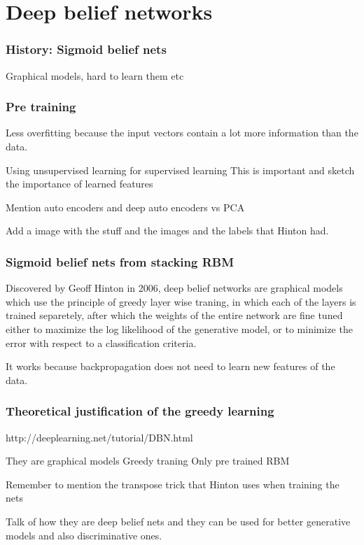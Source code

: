 \documentclass[11pt, fleqn, twoside]{article}
\begin{document}
\section{ Deep belief networks}

\subsubsection{ History: Sigmoid belief nets}
  Graphical models, hard to learn them etc

\subsubsection{Pre training}
  Less overfitting because the input vectors contain a lot more information than the data.

  Using unsupervised learning for supervised learning
  This is important and sketch the importance of learned features

  Mention auto encoders and deep auto encoders vs PCA

  Add a image with the stuff and the images and the labels that Hinton had.


\subsubsection{ Sigmoid belief nets from stacking RBM}
  Discovered by Geoff Hinton in 2006, deep belief networks are graphical models which use the principle of greedy layer wise traning, in which each of the layers is trained separetely, after which the weights of the entire network are fine tuned either to maximize the log likelihood of the generative model, or to minimize the error with respect to a classification criteria.

  It works because backpropagation does not need to learn new features of the data.


\subsubsection {Theoretical justification of the greedy learning}
  http://deeplearning.net/tutorial/DBN.html

  They are graphical models
  Greedy traning
  Only pre trained RBM

  Remember to mention the transpose trick that Hinton uses when training the nets

  Talk of how they are deep belief nets and they can be used for better generative models and also discriminative ones.
\end{document}
